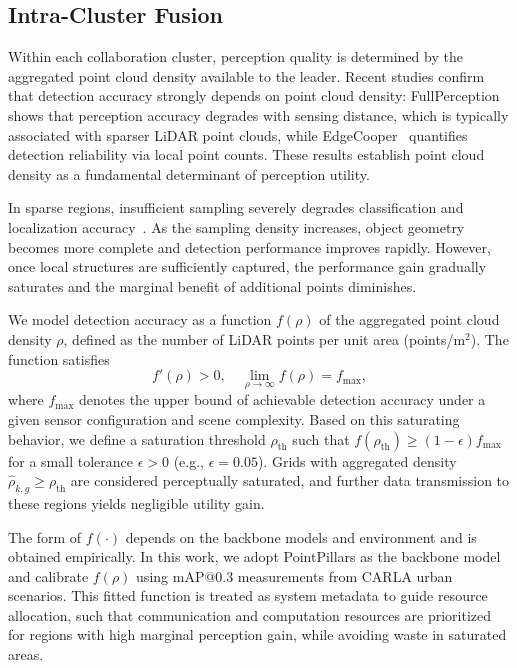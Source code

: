 \documentclass[conference]{IEEEtran}
\begin{document}
\subsection{Intra-Cluster Fusion}
\label{sec:intra_cluster}
Within each collaboration cluster, perception quality is determined by the aggregated point cloud density available to the leader. Recent studies confirm that detection accuracy strongly depends on point cloud density: FullPerception~\cite{liang2025fullperception} shows that perception accuracy degrades with sensing distance, which is typically associated with sparser LiDAR point clouds, while EdgeCooper~\cite{luo2023edgecooper} quantifies detection reliability via local point counts. These results establish point cloud density as a fundamental determinant of perception utility.

In sparse regions, insufficient sampling severely degrades classification and localization accuracy~\cite{luo2023edgecooper}. As the sampling density increases, object geometry becomes more complete and detection performance improves rapidly. However, once local structures are sufficiently captured, the performance gain gradually saturates and the marginal benefit of additional points diminishes.

We model detection accuracy as a function $f(\rho)$ of the aggregated point cloud density $\rho$, defined as the number of LiDAR points per unit area (points/m$^2$). The function satisfies
\begin{equation}
f'(\rho) > 0, \quad \lim_{\rho \to \infty} f(\rho) = f_{\max},
\end{equation}
where $f_{\max}$ denotes the upper bound of achievable detection accuracy under a given sensor configuration and scene complexity. Based on this saturating behavior, we define a saturation threshold $\rho_{\mathrm{th}}$ such that $f(\rho_{\mathrm{th}}) \geq (1 - \epsilon) f_{\max}$ for a small tolerance $\epsilon > 0$ (e.g., $\epsilon = 0.05$). Grids with aggregated density $\hat{\rho}_{k,g} \geq \rho_{\mathrm{th}}$ are considered perceptually saturated, and further data transmission to these regions yields negligible utility gain.

The form of $f(\cdot)$ depends on the backbone models and environment and is obtained empirically. In this work, we adopt PointPillars as the backbone model and calibrate $f(\rho)$ using mAP@0.3 measurements from CARLA urban scenarios. This fitted function is treated as system metadata to guide resource allocation, such that communication and computation resources are prioritized for regions with high marginal perception gain, while avoiding waste in saturated areas.
\end{document}
